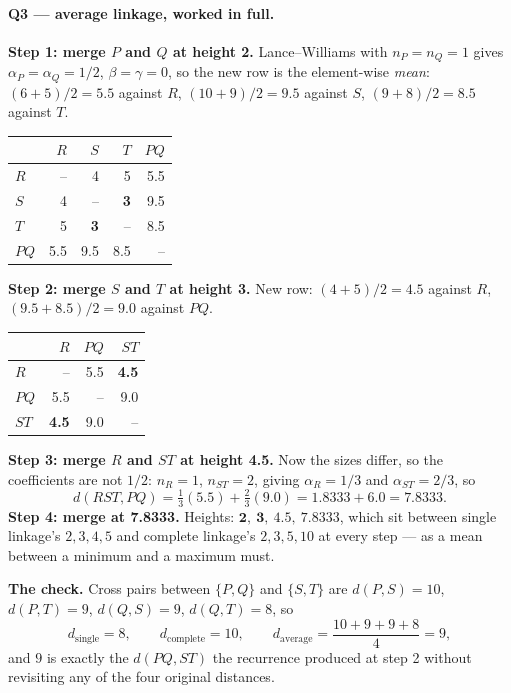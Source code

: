 \documentclass[11pt]{article}
\begin{document}
\paragraph{Q3 --- average linkage, worked in full.}
\textbf{Step 1: merge $P$ and $Q$ at height 2.} Lance--Williams with
$n_P = n_Q = 1$ gives $\alpha_P = \alpha_Q = 1/2$, $\beta = \gamma = 0$, so the
new row is the element-wise \emph{mean}: $(6{+}5)/2 = 5.5$ against $R$,
$(10{+}9)/2 = 9.5$ against $S$, $(9{+}8)/2 = 8.5$ against $T$.
\begin{center}\small
\begin{tabular}{lrrrr}
  \toprule
  & $R$ & $S$ & $T$ & $PQ$ \\
  \midrule
  $R$  & -- & 4 & 5 & 5.5 \\
  $S$  & 4  & --& \textbf{3} & 9.5 \\
  $T$  & 5  & \textbf{3} & --& 8.5 \\
  $PQ$ & 5.5 & 9.5 & 8.5 & -- \\
  \bottomrule
\end{tabular}
\end{center}
\textbf{Step 2: merge $S$ and $T$ at height 3.} New row: $(4{+}5)/2 = 4.5$
against $R$, $(9.5{+}8.5)/2 = 9.0$ against $PQ$.
\begin{center}\small
\begin{tabular}{lrrr}
  \toprule
  & $R$ & $PQ$ & $ST$ \\
  \midrule
  $R$  & -- & 5.5 & \textbf{4.5} \\
  $PQ$ & 5.5 & --& 9.0 \\
  $ST$ & \textbf{4.5} & 9.0 & -- \\
  \bottomrule
\end{tabular}
\end{center}
\textbf{Step 3: merge $R$ and $ST$ at height 4.5.} Now the sizes differ, so
the coefficients are not $1/2$: $n_R = 1$, $n_{ST} = 2$, giving
$\alpha_R = 1/3$ and $\alpha_{ST} = 2/3$, so
\[
  d(RST, PQ) = \tfrac13(5.5) + \tfrac23(9.0)
             = 1.8333 + 6.0 = 7.8333 .
\]
\textbf{Step 4: merge at 7.8333.} Heights: $\mathbf{2,\ 3,\ 4.5,\ 7.8333}$,
which sit between single linkage's $2, 3, 4, 5$ and complete linkage's
$2, 3, 5, 10$ at every step --- as a mean between a minimum and a maximum
must.

\textbf{The check.} Cross pairs between $\{P,Q\}$ and $\{S,T\}$ are
$d(P,S) = 10$, $d(P,T) = 9$, $d(Q,S) = 9$, $d(Q,T) = 8$, so
\[
  d_{\text{single}} = 8, \qquad d_{\text{complete}} = 10, \qquad
  d_{\text{average}} = \frac{10+9+9+8}{4} = 9 ,
\]
and $9$ is exactly the $d(PQ, ST)$ the recurrence produced at step 2 without
revisiting any of the four original distances.
\end{document}
